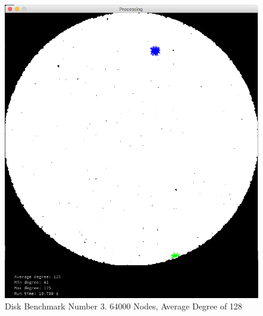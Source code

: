 \documentclass{article}
\begin{document}
\begin{center}
    \begin{figure}
        \includegraphics[scale=0.45]{./images/disk_2.png}
        \caption{Disk Benchmark Number 3. 64000 Nodes, Average Degree of 128}
        \label{disk2}
    \end{figure}
\end{center}
\end{document}
